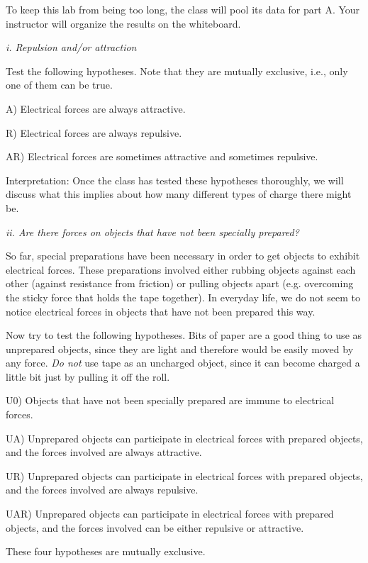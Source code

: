 To keep this lab from being too long, the class will pool its data
for part A. Your instructor will organize the results on the whiteboard.

\vfill

\emph{i. Repulsion and/or attraction}

Test the following hypotheses. Note that they are
mutually exclusive, i.e., only one of them can be true.

A) Electrical forces are always attractive.

R) Electrical forces are always repulsive.

AR) Electrical forces are sometimes attractive and
sometimes repulsive.

Interpretation: Once the class has tested these
hypotheses thoroughly, we will discuss what
this implies about how many different types of charge there might be.

\vfill

\emph{ii. Are there forces on objects that have not been specially prepared?}

So far, special preparations have been necessary in order to
get objects to exhibit electrical forces. These preparations
involved either rubbing objects against each other (against
resistance from friction) or pulling objects apart (e.g.
overcoming the sticky force that holds the tape together).
In everyday life, we do not seem to notice electrical forces
in objects that have not been prepared this way.

Now try to test the following hypotheses. Bits of paper are
a good thing to use as unprepared objects, since they are
light and therefore would be easily moved by any force.
\emph{Do not} use tape as an uncharged object, since it can
become charged a little bit just by pulling it off the roll.

\pagebreak

U0) Objects that have not been specially prepared are immune
to electrical forces.

UA) Unprepared objects can participate in electrical forces
with prepared objects, and the forces involved are always attractive.

UR) Unprepared objects can participate in electrical forces
with prepared objects, and the forces involved are always repulsive.

UAR) Unprepared objects can participate in electrical forces
with prepared objects, and the forces involved can be either
repulsive or attractive.

These four hypotheses are mutually exclusive.

